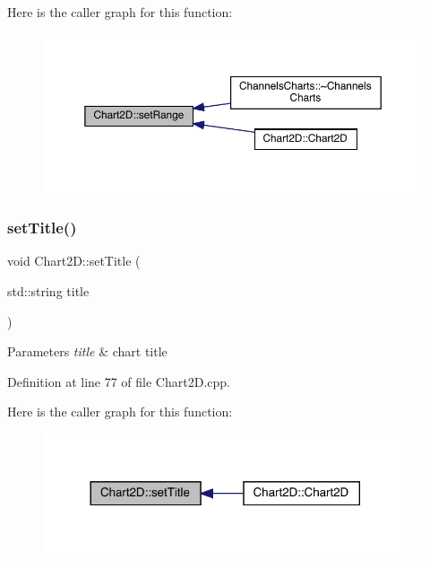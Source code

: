 Here is the caller graph for this function\+:
\nopagebreak
\begin{figure}[H]
\begin{center}
\leavevmode
\includegraphics[width=350pt]{class_chart2_d_acc60a5df11a3bb47c7888e108cd50f05_icgraph}
\end{center}
\end{figure}
\mbox{\label{class_chart2_d_ac148952b822fcb1d0c865a7f36af85e4}} 
\subsubsection{\texorpdfstring{set\+Title()}{setTitle()}}
{\footnotesize\ttfamily void Chart2\+D\+::set\+Title (\begin{DoxyParamCaption}\item[{std\+::string}]{title }\end{DoxyParamCaption})}


\begin{DoxyParams}{Parameters}
{\em title} & chart title \\
\hline
\end{DoxyParams}


Definition at line 77 of file Chart2\+D.\+cpp.

Here is the caller graph for this function\+:
\nopagebreak
\begin{figure}[H]
\begin{center}
\leavevmode
\includegraphics[width=305pt]{class_chart2_d_ac148952b822fcb1d0c865a7f36af85e4_icgraph}
\end{center}
\end{figure}


